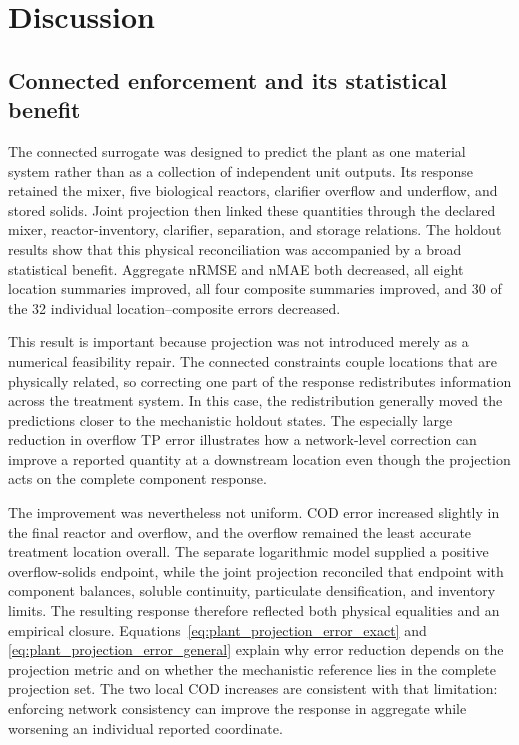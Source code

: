 \section{Discussion}
\label{sec:plant_discussion}

\subsection{Connected enforcement and its statistical benefit}

The connected surrogate was designed to predict the plant as one material system rather than as a collection of independent unit outputs. Its response retained the mixer, five biological reactors, clarifier overflow and underflow, and stored solids. Joint projection then linked these quantities through the declared mixer, reactor-inventory, clarifier, separation, and storage relations. The holdout results show that this physical reconciliation was accompanied by a broad statistical benefit. Aggregate nRMSE and nMAE both decreased, all eight location summaries improved, all four composite summaries improved, and 30 of the 32 individual location--composite errors decreased.

This result is important because projection was not introduced merely as a numerical feasibility repair. The connected constraints couple locations that are physically related, so correcting one part of the response redistributes information across the treatment system. In this case, the redistribution generally moved the predictions closer to the mechanistic holdout states. The especially large reduction in overflow TP error illustrates how a network-level correction can improve a reported quantity at a downstream location even though the projection acts on the complete component response.

The improvement was nevertheless not uniform. COD error increased slightly in the final reactor and overflow, and the overflow remained the least accurate treatment location overall. The separate logarithmic model supplied a positive overflow-solids endpoint, while the joint projection reconciled that endpoint with component balances, soluble continuity, particulate densification, and inventory limits. The resulting response therefore reflected both physical equalities and an empirical closure. Equations~\eqref{eq:plant_projection_error_exact} and \eqref{eq:plant_projection_error_general} explain why error reduction depends on the projection metric and on whether the mechanistic reference lies in the complete projection set. The two local COD increases are consistent with that limitation: enforcing network consistency can improve the response in aggregate while worsening an individual reported coordinate.

